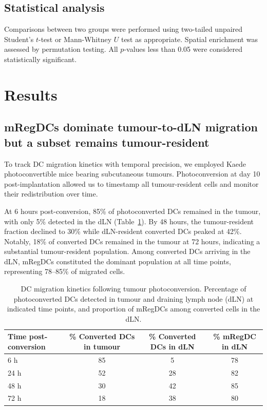 \documentclass[11pt]{article}
\begin{document}
\subsection{Statistical analysis}
Comparisons between two groups were performed using two-tailed unpaired Student's $t$-test or Mann-Whitney $U$ test as appropriate. Spatial enrichment was assessed by permutation testing. All $p$-values less than 0.05 were considered statistically significant.

\section{Results}

\subsection{mRegDCs dominate tumour-to-dLN migration but a subset remains tumour-resident}

To track DC migration kinetics with temporal precision, we employed Kaede photoconvertible mice bearing subcutaneous tumours. Photoconversion at day 10 post-implantation allowed us to timestamp all tumour-resident cells and monitor their redistribution over time.

At 6 hours post-conversion, 85\% of photoconverted DCs remained in the tumour, with only 5\% detected in the dLN (Table~\ref{tab:migration}). By 48 hours, the tumour-resident fraction declined to 30\% while dLN-resident converted DCs peaked at 42\%. Notably, 18\% of converted DCs remained in the tumour at 72 hours, indicating a substantial tumour-resident population. Among converted DCs arriving in the dLN, mRegDCs constituted the dominant population at all time points, representing 78--85\% of migrated cells.

\begin{table}[htbp]
\centering
\caption{DC migration kinetics following tumour photoconversion. Percentage of photoconverted DCs detected in tumour and draining lymph node (dLN) at indicated time points, and proportion of mRegDCs among converted cells in the dLN.}
\label{tab:migration}
\begin{tabular}{@{}lccc@{}}
\toprule
Time post-conversion & \% Converted DCs in tumour & \% Converted DCs in dLN & \% mRegDC in dLN \\
\midrule
6 h  & 85 & 5  & 78 \\
24 h & 52 & 28 & 82 \\
48 h & 30 & 42 & 85 \\
72 h & 18 & 38 & 80 \\
\bottomrule
\end{tabular}
\end{table}
\end{document}
